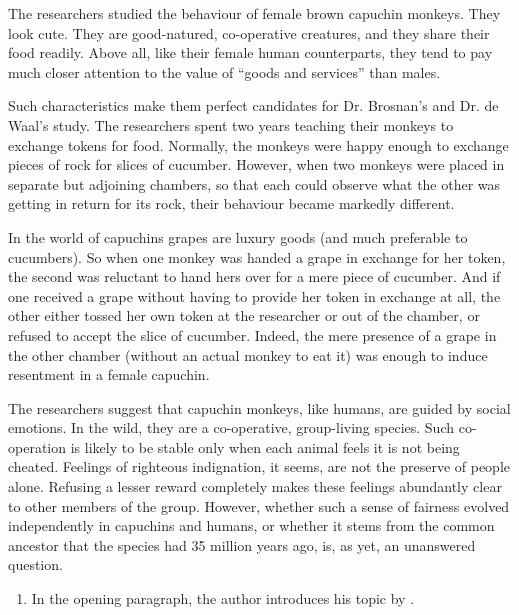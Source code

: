 {The researchers studied the behaviour of female brown capuchin monkeys.
They look cute. They are good-natured, co-operative creatures, and they
share their food readily. Above all, like their female human
counterparts, they tend to pay much closer attention to the value of
``goods and services'' than males.

Such characteristics make them perfect candidates for Dr. Brosnan's and
Dr. de Waal's study. The researchers spent two years teaching their
monkeys to exchange tokens for food. Normally, the monkeys were happy
enough to exchange pieces of rock for slices of cucumber. However, when
two monkeys were placed in separate but adjoining chambers, so that each
could observe what the other was getting in return for its rock, their
behaviour became markedly different.

In the world of capuchins grapes are luxury goods (and much preferable
to cucumbers). So when one monkey was handed a grape in exchange for her
token, the second was reluctant to hand hers over for a mere piece of
cucumber. And if one received a grape without having to provide her
token in exchange at all, the other either tossed her own token at the
researcher or out of the chamber, or refused to accept the slice of
cucumber. Indeed, the mere presence of a grape in the other chamber
(without an actual monkey to eat it) was enough to induce resentment in
a female capuchin.

The researchers suggest that capuchin monkeys, like humans, are guided
by social emotions. In the wild, they are a co-operative, group-living
species. Such co-operation is likely to be stable only when each animal
feels it is not being cheated. Feelings of righteous indignation, it
seems, are not the preserve of people alone. Refusing a lesser reward
completely makes these feelings abundantly clear to other members of the
group. However, whether such a sense of fairness evolved independently
in capuchins and humans, or whether it stems from the common ancestor
that the species had 35 million years ago, is, as yet, an unanswered
question.

\begin{enumerate}[resume]
	\item
In the opening paragraph, the author introduces his topic by \lineread.



\end{enumerate}}
